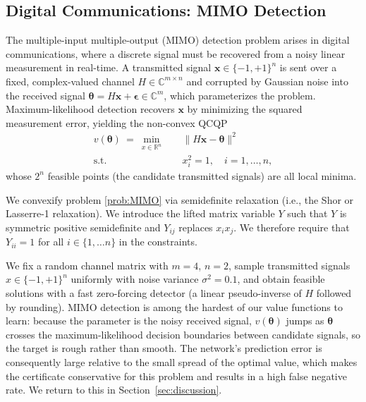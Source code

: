 \documentclass[10pt]{article} %
\theoremstyle{plain}
\theoremstyle{definition}
\theoremstyle{remark}
\begin{document}
\subsection{Digital Communications: MIMO Detection}

The multiple-input multiple-output (MIMO) detection problem arises in digital communications, where a discrete signal must be recovered from a noisy linear measurement in real-time. A transmitted signal $\mathbf{x} \in \{-1, +1\}^n$ is sent over a fixed, complex-valued channel $H \in \mathbb{C}^{m \times n}$ and corrupted by Gaussian noise into the received signal $\bm{\theta} = H \mathbf{x} + \bm{\epsilon} \in \mathbb{C}^{m}$, which parameterizes the problem. Maximum-likelihood detection recovers $\mathbf{x}$ by minimizing the squared measurement error, yielding the non-convex QCQP
\begin{equation}
\begin{aligned}
    v(\bm{\theta}) ~=~ \min_{x \in \mathbb{R}^n} \quad & \|H \mathbf{x} - \bm{\theta}\|^2 \\
    \text{s.t.} \quad & x_i^2 = 1, \quad i = 1, \ldots, n,
\end{aligned}
\label{prob:MIMO}
\end{equation}
whose $2^n$ feasible points (the candidate transmitted signals) are all local minima.

We convexify problem \cref{prob:MIMO}{}{} via semidefinite relaxation (i.e., the Shor or Lasserre-1 relaxation). We introduce the lifted matrix variable $Y$ such that $Y$ is symmetric positive semidefinite and $Y_{ij}$ replaces $x_i x_j$. We therefore require that $Y_{ii} = 1$ for all $i \in \{1, \dots n\}$ in the constraints.

We fix a random channel matrix with $m = 4$, $n = 2$, sample transmitted signals $x \in \{-1, +1\}^n$ uniformly with noise variance $\sigma^2 = 0.1$, and obtain feasible solutions with a fast zero-forcing detector (a linear pseudo-inverse of $H$ followed by rounding). MIMO detection is among the hardest of our value functions to learn: because the parameter is the noisy received signal, $v(\bm{\theta})$ jumps as $\bm{\theta}$ crosses the maximum-likelihood decision boundaries between candidate signals, so the target is rough rather than smooth. The network's prediction error is consequently large relative to the small spread of the optimal value, which makes the certificate conservative for this problem and results in a high false negative rate. We return to this in Section~\ref{sec:discussion}.
\end{document}
